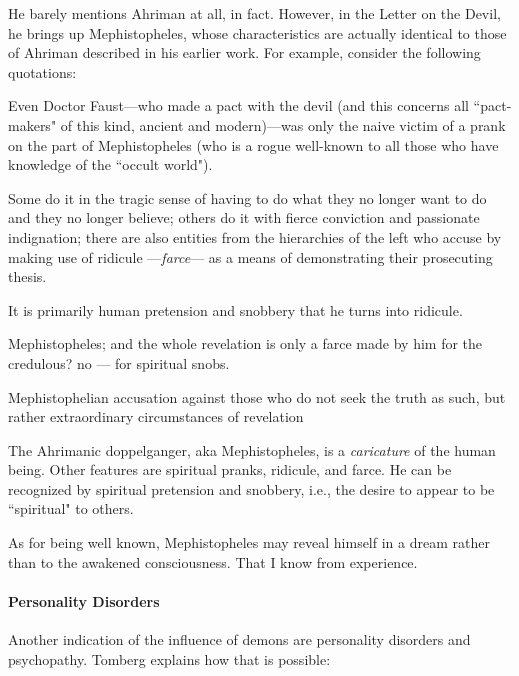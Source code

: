 He barely mentions Ahriman at all, in fact. However, in the Letter on the Devil, he brings up Mephistopheles, whose characteristics are actually identical to those of Ahriman described in his earlier work. For example, consider the following quotations:

\begin{quotex}
Even Doctor Faust—who made a pact with the devil (and this concerns all ``pact-makers" of this kind, ancient and modern)—was only the naive victim of a prank on the part of Mephistopheles (who is a rogue well-known to all those who have knowledge of the ``occult world").

Some do it in the tragic sense of having to do what they no longer want to do and they no longer believe; others do it with fierce conviction and passionate indignation; there are also entities from the hierarchies of the left who accuse by making use of ridicule —\emph{farce}— as a means of demonstrating their prosecuting thesis.

It is primarily human pretension and snobbery that he turns into ridicule.

Mephistopheles; and the whole revelation is only a farce made by him for the credulous? no — for spiritual snobs.

Mephistophelian accusation against those who do not seek the truth as such, but rather extraordinary circumstances of revelation

\end{quotex}
The Ahrimanic doppelganger, aka Mephistopheles, is a \emph{caricature} of the human being. Other features are spiritual pranks, ridicule, and farce. He can be recognized by spiritual pretension and snobbery, i.e., the desire to appear to be ``spiritual" to others.

As for being well known, Mephistopheles may reveal himself in a dream rather than to the awakened consciousness. That I know from experience.

\paragraph{Personality Disorders}
Another indication of the influence of demons are personality disorders and psychopathy. Tomberg explains how that is possible:

